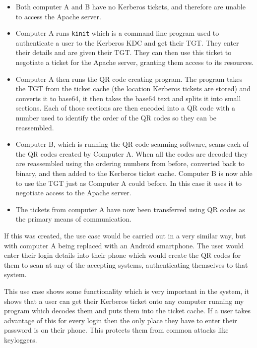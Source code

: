 \documentclass[]{report}   %
\begin{document}
\begin{itemize}
    \item Both computer A and B have no Kerberos tickets, and therefore are unable to access the Apache server.
    \item Computer A runs \texttt{kinit} which is a command line program used to authenticate a user to the Kerberos KDC and get their TGT. They enter their details and are given their TGT. They can then use this ticket to negotiate a ticket for the Apache server, granting them access to its resources.
    \item Computer A then runs the QR code creating program. The program takes the TGT from the ticket cache (the location Kerberos tickets are stored) and converts it to base64, it then takes the base64 text and splits it into small sections. Each of those sections are then encoded into a QR code with a number used to identify the order of the QR codes so they can be reassembled.
    \item Computer B, which is running the QR code scanning software, scans each of the QR codes created by Computer A. When all the codes are decoded they are reassembled using the ordering numbers from before, converted back to binary, and then added to the Kerberos ticket cache. Computer B is now able to use the TGT just as Computer A could before. In this case it uses it to negotiate access to the Apache server.
    \item The tickets from computer A have now been transferred using QR codes as the primary means of communication.
\end{itemize}

If this was created, the use case would be carried out in a very similar way, but with computer A being replaced with an Android smartphone. The user would enter their login details into their phone which would create the QR codes for them to scan at any of the accepting systems, authenticating themselves to that system.

This use case shows some functionality which is very important in the system, it shows that a user can get their Kerberos ticket onto any computer running my program which decodes them and puts them into the ticket cache. If a user takes advantage of this for every login then the only place they have to enter their password is on their phone. This protects them from common attacks like keyloggers.
\end{document}
